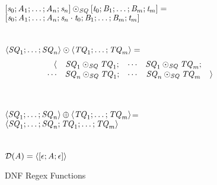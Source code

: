 \documentclass[numbers,10pt,preprint\ifanon ,nocopyrightspace\fi]{sigplanconf}
\begin{document}
\begin{figure}
  \ConcatSequence{} \OfType{} \ArrowTypeOf{\SequenceType{}}{\ArrowTypeOf{\SequenceType{}}{\SequenceType{}}}\\
  $[\mathit{s}_0;\mathit{A}_1;\ldots;\mathit{A}_n;\mathit{s}_n]\odot_{\mathit{SQ}}[\mathit{t}_0;\mathit{B}_1;\ldots;\mathit{B}_m;\mathit{t}_m]=$\\
  \hspace*{2ex}$[\mathit{s}_0;\mathit{A}_1;\ldots;\mathit{A}_n;\mathit{s}_n\cdot\mathit{t}_0;\mathit{B}_1;\ldots;\mathit{B}_m;\mathit{t}_m]$\\
  \\
  \ConcatDNF{} \OfType{} \ArrowTypeOf{\DNFRegexType{}}{\ArrowTypeOf{\DNFRegexType{}}{\DNFRegexType{}}}\\
  $\langle\mathit{SQ}_1;\ldots;\mathit{SQ}_n\rangle\odot\langle\mathit{TQ}_1;\ldots;\mathit{TQ}_m\rangle=$
  \[
    \begin{array}{rcccl}
      \langle & \mathit{SQ}_1\odot_{\mathit{SQ}}\mathit{TQ}_1; & \cdots
      & \mathit{SQ}_1\odot_{\mathit{SQ}}\mathit{TQ}_m; \\
      \cdots  & \mathit{SQ}_n\odot_{\mathit{SQ}}\mathit{TQ}_1; & \cdots & \mathit{SQ}_n\odot_{\mathit{SQ}}\mathit{TQ}_m & \rangle
    \end{array}
  \]
  \\
  \OrDNF{} \OfType{}
  \ArrowTypeOf{\DNFRegexType{}}{\ArrowTypeOf{\DNFRegexType{}}{\DNFRegexType{}}
  }\\
  $\langle\mathit{SQ}_1;\ldots;\mathit{SQ}_n\rangle\oplus\langle\mathit{TQ}_1;\ldots;\mathit{TQ}_m\rangle$=\\
  \hspace*{2ex}$\langle\mathit{SQ}_1;\ldots;\mathit{SQ}_n;\mathit{TQ}_1;\ldots;\mathit{TQ}_m\rangle$
  \\\\
  \AtomToDNF{} \OfType
  \ArrowTypeOf{\AtomType{}}{\DNFRegexType{}}\\
  $\mathcal{D}(\mathit{A}) = \langle[\epsilon;\mathit{A};\epsilon]\rangle$
  \caption{DNF Regex Functions}
  \label{fig:dnf-regex-functions}
\end{figure}
\end{document}
